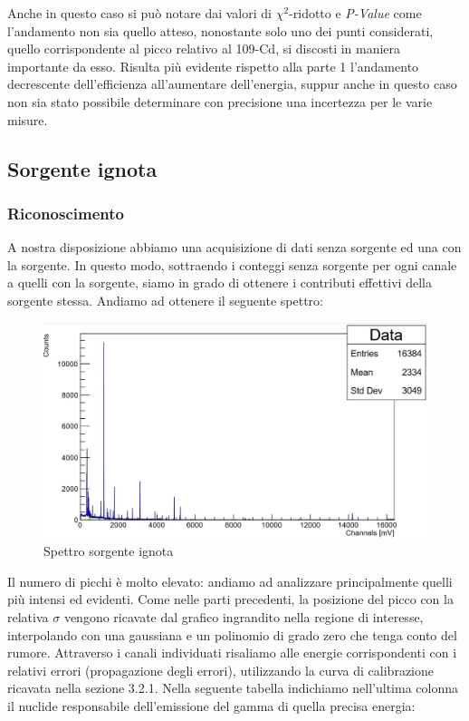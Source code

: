 \documentclass[a4paper,10pt]{article}
\begin{document}
\noindent Anche in questo caso si pu\`o notare dai valori di $\chi^2$-ridotto e \textit{P-Value} come l'andamento non sia quello atteso, nonostante solo uno dei punti considerati, quello corrispondente al picco relativo al 109-Cd, si discosti in maniera importante da esso. Risulta pi\`u evidente rispetto alla parte 1 l'andamento decrescente dell'efficienza all'aumentare dell'energia, suppur anche in questo caso non sia stato possibile determinare con precisione una incertezza per le varie misure.

\subsection{Sorgente ignota}


\subsubsection{Riconoscimento}
A nostra disposizione abbiamo una acquisizione di dati senza sorgente ed una con la sorgente. In questo modo, sottraendo i conteggi senza sorgente per ogni canale a quelli con la sorgente, siamo in grado di ottenere i contributi effettivi della sorgente stessa. Andiamo ad ottenere il seguente spettro:

\begin{figure}[H]
    \centering
    \includegraphics[scale=0.6]{grafici/sorgenteignota}
    \caption{Spettro sorgente ignota}
\end{figure}

\noindent Il numero di picchi \`e molto elevato: andiamo ad analizzare principalmente quelli pi\`u intensi ed evidenti. Come nelle parti precedenti, la posizione del picco con la relativa $\sigma$ vengono ricavate dal grafico ingrandito nella regione di interesse, interpolando con una gaussiana e un polinomio di grado zero che tenga conto del rumore. Attraverso i canali individuati risaliamo alle energie corrispondenti con i relativi errori (propagazione degli errori), utilizzando la curva di calibrazione ricavata nella sezione 3.2.1. Nella seguente tabella indichiamo nell'ultima colonna il nuclide responsabile dell'emissione del gamma di quella precisa energia:
\end{document}
